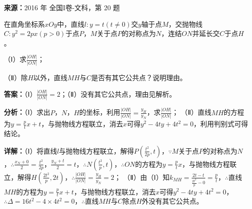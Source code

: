 \begin{question}[points=12]
\textbf{来源：}2016 年 全国I卷-文科，第 20 题\par
在直角坐标系$xOy$中，直线$l:y=t(t\neq0)$交$y$轴于点$M$，交抛物线$C:y^2=2px(p>0)$于点$P$，$M$关于点$P$的对称点为$N$，连结$ON$并延长交$C$于点$H$。

（Ⅰ）求$\frac{|OH|}{|ON|}$；

（Ⅱ）除$H$以外，直线$MH$与$C$是否有其它公共点？说明理由。
\begin{solution}
\textbf{答案：}（Ⅰ）$\frac{|OH|}{|ON|}=2$；（Ⅱ）没有其它公共点，理由见解析。

\textbf{分析：}（Ⅰ）求出$P$，$N$，$H$的坐标，利用$\frac{|OH|}{|ON|}=\frac{y_H}{y_N}$，求$\frac{|OH|}{|ON|}$；
（Ⅱ）直线$MH$的方程为$y=\frac{p}{t}x+t$，与抛物线方程联立，消去$x$可得$y^2-4ty+4t^2=0$，利用判别式可得结论。

\textbf{详解：}（Ⅰ）将直线$l$与抛物线方程联立，解得$P(\frac{t^2}{2p},t)$，$\because M$关于点$P$的对称点为$N$，$\therefore \frac{x_N+0}{2}=\frac{t^2}{2p}$，$\frac{y_N+t}{2}=t$，$\therefore N(\frac{t^2}{p},t)$，$\therefore ON$的方程为$y=\frac{p}{t}x$，与抛物线方程联立，解得$H(\frac{2t^2}{p},2t)$，$\therefore \frac{|OH|}{|ON|}=\frac{y_H}{y_N}=2$；
（Ⅱ）由（Ⅰ）知$k_{MH}=\frac{2t-t}{\frac{2t^2}{p}-0}=\frac{p}{t}$，$\therefore$直线$MH$的方程为$y=\frac{p}{t}x+t$，与抛物线方程联立，消去$x$可得$y^2-4ty+4t^2=0$，$\therefore \Delta=16t^2-4\times4t^2=0$，$\therefore$直线$MH$与$C$除点$H$外没有其它公共点。
\end{solution}
\end{question}


